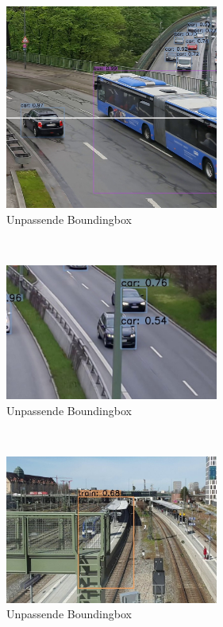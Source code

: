 \documentclass[conference]{IEEEtran}
\begin{document}
	\begin{figure}[!h]
		\begin{center}
			\includegraphics[width=7cm]{Media/Output_777 - Kopie.jpg}
			\caption{Unpassende Boundingbox}
			\label{UB}
		\end{center}
	\end{figure}\\
	\begin{figure}[!h]
		\begin{center}
			\includegraphics[width=7cm]{Media/Output_276 - Kopie.jpg}
			\caption{Unpassende Boundingbox}
			\label{UB2}
		\end{center}
	\end{figure}\\
	\begin{figure}[!h]
		\begin{center}
			\includegraphics[width=7cm]{Media/Output_564.jpg}
			\caption{Unpassende Boundingbox}
			\label{UB3}
		\end{center}
	\end{figure}\\
\end{document}
